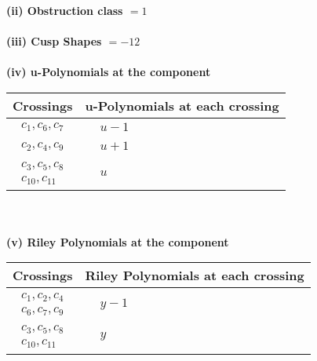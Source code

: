 \documentclass[1p]{elsarticle_modified}
\theoremstyle{definition}
\begin{document}
\flushleft \textbf{(ii) Obstruction class $= 1$}\\~\\
\flushleft \textbf{(iii) Cusp Shapes $= -12$}\\~\\
\newpage\renewcommand{\arraystretch}{1}
\flushleft \textbf{(iv) u-Polynomials at the component}\newline \\
\begin{tabular}{m{50pt}|m{274pt}}
Crossings & \hspace{64pt}u-Polynomials at each crossing \\
\hline $$\begin{aligned}c_{1},c_{6},c_{7}\end{aligned}$$&$\begin{aligned}
&u-1
\end{aligned}$\\
\hline $$\begin{aligned}c_{2},c_{4},c_{9}\end{aligned}$$&$\begin{aligned}
&u+1
\end{aligned}$\\
\hline $$\begin{aligned}c_{3},c_{5},c_{8}\\c_{10},c_{11}\end{aligned}$$&$\begin{aligned}
&u
\end{aligned}$\\
\hline
\end{tabular}\\~\\
\newpage\renewcommand{\arraystretch}{1}
\flushleft \textbf{(v) Riley Polynomials at the component}\newline \\
\begin{tabular}{m{50pt}|m{274pt}}
Crossings & \hspace{64pt}Riley Polynomials at each crossing \\
\hline $$\begin{aligned}c_{1},c_{2},c_{4}\\c_{6},c_{7},c_{9}\end{aligned}$$&$\begin{aligned}
&y-1
\end{aligned}$\\
\hline $$\begin{aligned}c_{3},c_{5},c_{8}\\c_{10},c_{11}\end{aligned}$$&$\begin{aligned}
&y
\end{aligned}$\\
\hline
\end{tabular}\\~\\
\end{document}
